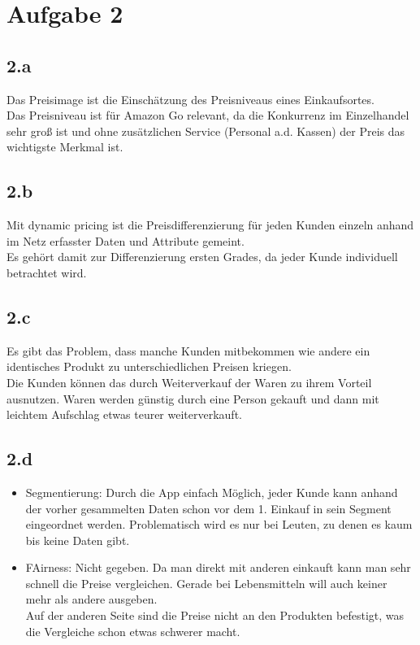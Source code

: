 \section{Aufgabe 2}
\subsection{2.a}
    Das Preisimage ist die Einschätzung des Preisniveaus eines Einkaufsortes. \\
    Das Preisniveau ist für Amazon Go relevant, da die Konkurrenz im Einzelhandel sehr groß ist und ohne zusätzlichen Service (Personal a.d. Kassen) der Preis das wichtigste Merkmal ist. \\

\subsection{2.b}
    Mit dynamic pricing ist die Preisdifferenzierung für jeden Kunden einzeln anhand im Netz erfasster Daten und Attribute gemeint. \\
    Es gehört damit zur Differenzierung ersten Grades, da jeder Kunde individuell betrachtet wird.

\subsection{2.c}
    Es gibt das Problem, dass manche Kunden mitbekommen wie andere ein identisches Produkt zu unterschiedlichen Preisen kriegen. \\
    Die Kunden können das durch Weiterverkauf der Waren zu ihrem Vorteil ausnutzen. Waren werden günstig durch eine Person gekauft und dann mit leichtem Aufschlag etwas teurer weiterverkauft.

\subsection{2.d}
    \begin{itemize}
        \item Segmentierung: Durch die App einfach Möglich, jeder Kunde kann anhand der vorher gesammelten Daten schon vor dem 1. Einkauf in sein Segment eingeordnet werden.
                Problematisch wird es nur bei Leuten, zu denen es kaum bis keine Daten gibt.
        \item FAirness: Nicht gegeben. Da man direkt mit anderen einkauft kann man sehr schnell die Preise vergleichen. Gerade bei Lebensmitteln will auch keiner mehr als andere ausgeben. \\
                Auf der anderen Seite sind die Preise nicht an den Produkten befestigt, was die Vergleiche schon etwas schwerer macht.
    \end{itemize}

